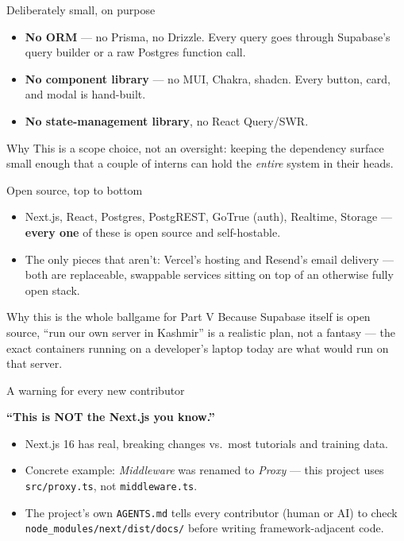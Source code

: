 \documentclass[aspectratio=169,11pt]{beamer}
\newcommand{\code}[1]{\textcolor{olkTealDark}{\texttt{#1}}}
\begin{document}
\begin{frame}{Deliberately small, on purpose}
  \begin{itemize}
    \item \textbf{No ORM} --- no Prisma, no Drizzle. Every query goes through Supabase's query builder or a raw Postgres function call.
    \item \textbf{No component library} --- no MUI, Chakra, shadcn. Every button, card, and modal is hand-built.
    \item \textbf{No state-management library}, no React Query/SWR.
  \end{itemize}
  \vfill
  \begin{block}{Why}
    This is a scope choice, not an oversight: keeping the dependency surface small enough that a couple of interns can hold the \emph{entire} system in their heads.
  \end{block}
\end{frame}

\begin{frame}{Open source, top to bottom}
  \begin{itemize}
    \item Next.js, React, Postgres, PostgREST, GoTrue (auth), Realtime, Storage --- \textbf{every one} of these is open source and self-hostable.
    \item The only pieces that aren't: Vercel's hosting and Resend's email delivery --- both are replaceable, swappable services sitting on top of an otherwise fully open stack.
  \end{itemize}
  \vfill
  \begin{alertblock}{Why this is the whole ballgame for Part V}
    Because Supabase itself is open source, ``run our own server in Kashmir'' is a realistic plan, not a fantasy --- the exact containers running on a developer's laptop today are what would run on that server.
  \end{alertblock}
\end{frame}

\begin{frame}{A warning for every new contributor}
  \begin{center}
    \Large\textbf{``This is NOT the Next.js you know.''}
  \end{center}
  \vspace{6pt}
  \begin{itemize}
    \item Next.js 16 has real, breaking changes vs.\ most tutorials and training data.
    \item Concrete example: \emph{Middleware} was renamed to \emph{Proxy} --- this project uses \code{src/proxy.ts}, not \code{middleware.ts}.
    \item The project's own \code{AGENTS.md} tells every contributor (human or AI) to check \code{node\_modules/next/dist/docs/} before writing framework-adjacent code.
  \end{itemize}
\end{frame}
\end{document}
